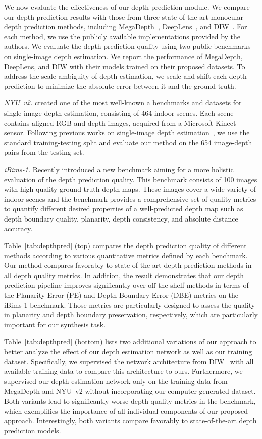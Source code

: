 \documentclass[acmtog,authorversion]{acmart}
\begin{document}
We now evaluate the effectiveness of our depth prediction module. We compare our depth prediction results with those from three state-of-the-art monocular depth prediction methods, including MegaDepth~\cite{Li_CVPR_2018}, DeepLens~\cite{Wang_TOG_2018}, and DIW~\cite{Chen_NIPS_2016}. For each method, we use the publicly available implementations provided by the authors. We evaluate the depth prediction quality using two public benchmarks on single-image depth estimation. We report the performance of MegaDepth, DeepLens, and DIW with their models trained on their proposed datasets. To address the scale-ambiguity of depth estimation, we scale and shift each depth prediction to minimize the absolute error between it and the ground truth.

\textit{NYU~v2.} \cite{Silberman_ECCV_2012} created one of the most well-known a benchmarks and datasets for single-image-depth estimation, consisting of 464 indoor scenes. Each scene contains aligned RGB and depth images, acquired from a Microsoft Kinect sensor. Following previous works on single-image depth estimation~\cite{Chen_NIPS_2016, Qi_CVPR_2018, Zoran_ICCV_2015}, we use the standard training-testing split and evaluate our method on the 654 image-depth pairs from the testing set.

\textit{iBims-1.} Recently \cite{Koch_ARXIV_2018} introduced a new benchmark aiming for a more holistic evaluation of the depth prediction quality. This benchmark consists of 100 images with high-quality ground-truth depth maps. These images cover a wide variety of indoor scenes and the benchmark provides a comprehensive set of quality metrics to quantify different desired properties of a well-predicted depth map such as depth boundary quality, planarity, depth consistency, and absolute distance accuracy.

Table~\ref{tab:depthpred} (top) compares the depth prediction quality of different methods according to various quantitative metrics defined by each benchmark. Our method compares favorably to state-of-the-art depth prediction methods in all depth quality metrics. In addition, the result demonstrates that our depth prediction pipeline improves significantly over off-the-shelf methods in terms of the Planarity Error (PE) and Depth Boundary Error (DBE) metrics on the iBims-1 benchmark. Those metrics are particularly designed to assess the quality in planarity and depth boundary preservation, respectively, which are particularly important for our synthesis task.

Table~\ref{tab:depthpred} (bottom) lists two additional variations of our approach to better analyze the effect of our depth estimation network as well as our training dataset. Specifically, we supervised the network architecture from DIW~\cite{Chen_NIPS_2016} with all available training data to compare this architecture to ours. Furthermore, we supervised our depth estimation network only on the training data from MegaDepth and NYU~v2 without incorporating our computer-generated dataset. Both variants lead to significantly worse depth quality metrics in the benchmark, which exemplifies the importance of all individual components of our proposed approach. Interestingly, both variants compare favorably to state-of-the-art depth prediction models.
\end{document}

